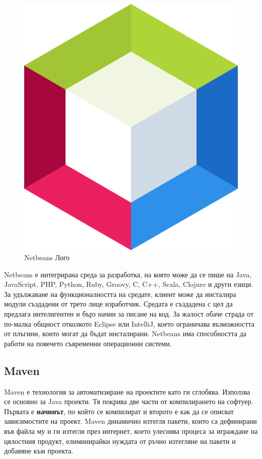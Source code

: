     \begin{figure}[h]
        \centering
       \includegraphics[scale=.05]{images/netbeans.png}
        \caption{Netbeans Лого}
        \label{fig:netbeans_logo}
    \end{figure}
    
    Netbeans е интегрирана среда за разработка, на която може да се пише на Java, JavaScript, PHP, Python, Ruby, Groovy, C, C++, Scala, Clojure и други езици. За удължаване на функционалността на средате, клиент може да инсталира модули създадени от трето лице изработчик.
    Средата е създадена с цел да предлага интелигентен и бърз начин за писане на код. За жалост обаче страда от по-малка общност отколкото Eclipse или IntelliJ, което ограничава възможността от плъгини, които могат да бъдат инсталирани.
    Netbeans има способността да работи на повечето съвременни операционни системи.
    
    \subsection{Maven}
    Maven е технология за автоматизиране на проектите като ги сглобява. Използва се основно за Java проекти.
    Тя покрива две части от компилирането на софтуер. Първата е \textbf{начинът}, по който се компилират и второто е как да се описват зависимостите на проект. Maven динамично изтегля пакети, които са дефинирани във файла му и ги изтегля през интернет, което улеснява процеса за играждане на цялостния продукт, елиминирайки нуждата от ръчно изтегляне на пакети и добавяне към проекта.
    
